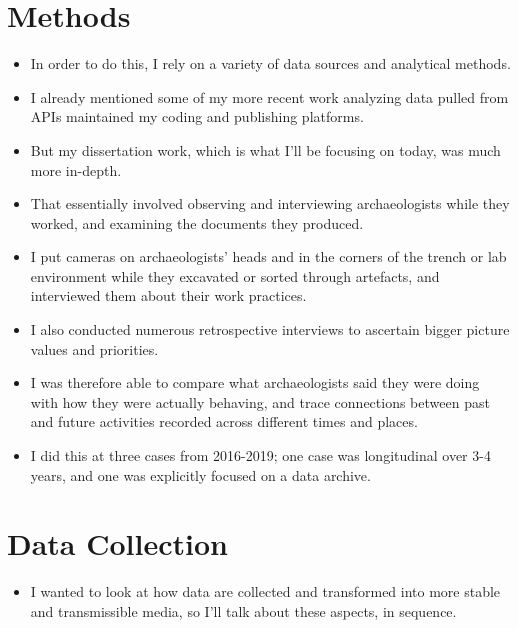 \documentclass{article}
\begin{document}
\section{Methods}
\begin{itemize}
  \item In order to do this, I rely on a variety of data sources and analytical methods.
  \item I already mentioned some of my more recent work analyzing data pulled from APIs maintained my coding and publishing platforms.
  \item But my dissertation work, which is what I'll be focusing on today, was much more in-depth.
  \item That essentially involved observing and interviewing archaeologists while they worked, and examining the documents they produced.
  \item I put cameras on archaeologists’ heads and in the corners of the trench or lab environment while they excavated or sorted through artefacts, and interviewed them about their work practices.
  \item I also conducted numerous retrospective interviews to ascertain bigger picture values and priorities.
  \item I was therefore able to compare what archaeologists said they were doing with how they were actually behaving, and trace connections between past and future activities recorded across different times and places.
  \item I did this at three cases from 2016-2019; one case was longitudinal over 3-4 years, and one was explicitly focused on a data archive.
\end{itemize}

\section{Data Collection}
\begin{itemize}
  \item I wanted to look at how data are collected and transformed into more stable and transmissible media, so I'll talk about these aspects, in sequence.
\end{itemize}
\end{document}

